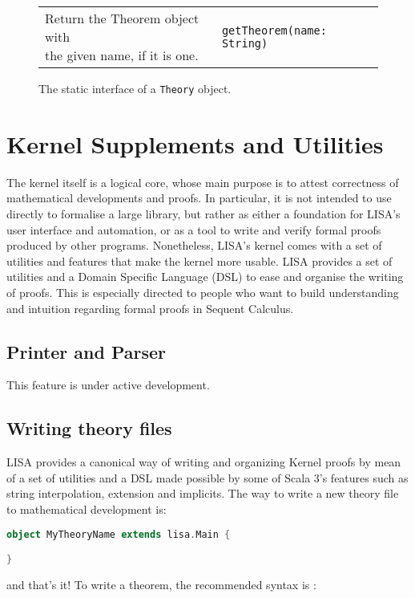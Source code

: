 {\begin{figure}[hp]
\begin{center}
\begin{tabular}{l|l}
\makecell[l]{Return the Theorem object with\\the given name, if it is one.} &
\begin{lstlisting}
getTheorem(name: String)
\end{lstlisting}
\\ %

\end{tabular}
\caption{The static interface of a \lstinline{Theory}{} object.}
\label{fig:theorygetters}
\end{center}
\end{figure}
}
\newpage
\section{Kernel Supplements and Utilities}
\label{sect:kernelsuppl}
The kernel itself is a logical core, whose main purpose is to attest correctness of mathematical developments and proofs. In particular, it is not intended to use directly to formalise a large library, but rather as either a foundation for LISA's user interface and automation, or as a tool to write and verify formal proofs produced by other programs.
Nonetheless, LISA's kernel comes with a set of utilities and features that make the kernel more usable.
LISA provides a set of utilities and a Domain Specific Language (DSL) to ease and organise the writing of proofs. This is especially directed to people who want to build understanding and intuition regarding formal proofs in Sequent Calculus.

\subsection{Printer and Parser}
This feature is under active development.

\subsection{Writing theory files}
LISA provides a canonical way of writing and organizing Kernel proofs by mean of a set of utilities and a DSL made possible by some of Scala 3's features such as string interpolation, extension and implicits. 
The way to write a new theory file to mathematical development is:
\begin{lstlisting}[language=Scala, frame=single]
object MyTheoryName extends lisa.Main {

}
\end{lstlisting}
and that's it! To write a theorem, the recommended syntax is 
:

